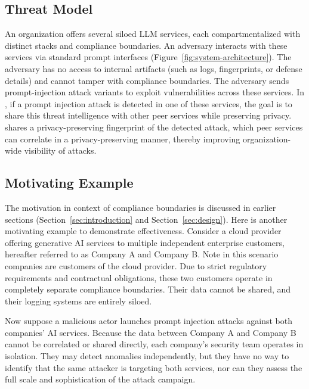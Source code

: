 
\appendix

\appendices




\subsection{Threat Model}
 An organization offers several siloed LLM services, each compartmentalized with distinct stacks and compliance boundaries. An adversary interacts with these services via standard prompt interfaces (Figure~\ref{fig:system-architecture}). The adversary has no access to internal artifacts (such as logs, fingerprints, or defense details) and cannot tamper with compliance boundaries. The adversary sends prompt-injection attack variants to exploit vulnerabilities across these services. In \tool, if a prompt injection attack is detected in one of these services, the goal is to share this threat intelligence with other peer services while preserving privacy. \tool shares a privacy-preserving fingerprint of the detected attack, which peer services can correlate in a privacy-preserving manner, thereby improving organization-wide visibility of attacks.

\subsection{Motivating Example}
The motivation in context of compliance boundaries is discussed in earlier sections (Section~\ref{sec:introduction} and Section~\ref{sec:design}). Here is another motivating example to demonstrate \tool effectiveness. 
Consider a cloud provider offering generative AI services to multiple independent enterprise customers, hereafter referred to as Company A and Company B. Note in this scenario companies are customers of the cloud provider. Due to strict regulatory requirements and contractual obligations, these two customers operate in completely separate compliance boundaries. Their data cannot be shared, and their logging systems are entirely siloed.
 
Now suppose a malicious actor launches prompt injection attacks against both companies' AI services. Because the data between Company A and Company B cannot be correlated or shared directly, each company's security team operates in isolation. They may detect anomalies independently, but they have no way to identify that the same attacker is targeting both services, nor can they assess the full scale and sophistication of the attack campaign.
 
